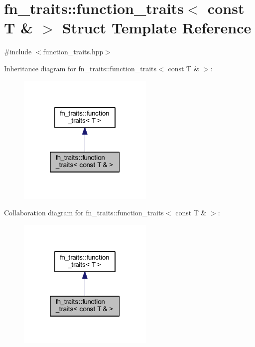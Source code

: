 \hypertarget{structfn__traits_1_1function__traits_3_01const_01_t_01_6_01_4}{}\section{fn\+\_\+traits\+:\+:function\+\_\+traits$<$ const T \& $>$ Struct Template Reference}
\label{structfn__traits_1_1function__traits_3_01const_01_t_01_6_01_4}


{\ttfamily \#include $<$function\+\_\+traits.\+hpp$>$}



Inheritance diagram for fn\+\_\+traits\+:\+:function\+\_\+traits$<$ const T \& $>$\+:\nopagebreak
\begin{figure}[H]
\begin{center}
\leavevmode
\includegraphics[width=184pt]{d2/dcd/structfn__traits_1_1function__traits_3_01const_01_t_01_6_01_4__inherit__graph}
\end{center}
\end{figure}


Collaboration diagram for fn\+\_\+traits\+:\+:function\+\_\+traits$<$ const T \& $>$\+:\nopagebreak
\begin{figure}[H]
\begin{center}
\leavevmode
\includegraphics[width=184pt]{db/d00/structfn__traits_1_1function__traits_3_01const_01_t_01_6_01_4__coll__graph}
\end{center}
\end{figure}


